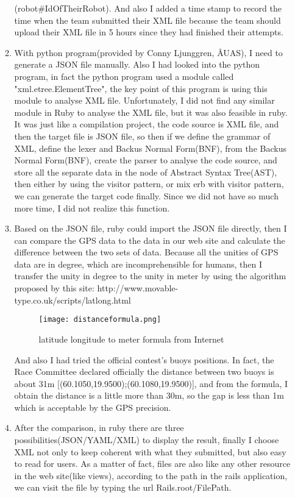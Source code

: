 \begin{itemize}
\begin{enumerate}
(robot\#IdOfTheirRobot). And also I added a time stamp to record the time when the team submitted their XML file because the team should upload their XML file in 5 hours since they had finished their attempts.
\item With python program(provided by Conny Ljunggren, ÅUAS), I need to generate a JSON file manually. Also I had looked into the python program, in fact the python program used a module called "xml.etree.ElementTree", the key point of this program is using this module to analyse XML file. Unfortunately, I did not find any similar module in Ruby to analyse the XML file, but it was also feasible in ruby. It was just like a compilation project, the code source is XML file, and then the target file is JSON file, so then if we define the grammar of XML, define the lexer and Backus Normal Form(BNF), from the Backus Normal Form(BNF), create the parser to analyse the code source, and store all the separate data in the node of Abstract Syntax Tree(AST), then either by using the visitor pattern, or mix erb with visitor pattern, we can generate the target code finally. Since we did not have so much more time, I did not realize this function.
\item Based on the JSON file, ruby could import the JSON file directly, then I can compare the GPS data to the data in our web site and calculate the difference between the two sets of data. Because all the unities of GPS data are in degree, which are incomprehensible for humans, then I transfer the unity in degree to the unity in meter by using the algorithm proposed by this site: 
http://www.movable-type.co.uk/scripts/latlong.html

\begin{figure}[h!]
    \centering
    \texttt{[image: distanceformula.png]}
    \caption{latitude longitude to meter formula from Internet}
    \label{fig-sample}
\end{figure}
And also I had tried the official contest's buoys positions. In fact, the Race Committee declared officially the distance between two buoys is about 31m [(60.1050,19.9500);(60.1080,19.9500)], and from the formula, I obtain the distance is a little more than 30m, so the gap is less than 1m which is acceptable by the GPS precision.
\item After the comparison, in ruby there are three possibilities(JSON/YAML/XML) to display the result, finally I choose XML not only to keep coherent with what they submitted, but also easy to read for users. As a matter of fact, files are also like any other resource in the web site(like views), according to the path in the rails application, we can visit the file by typing the url Rails.root/FilePath.
\end{enumerate}
 
\end{itemize}